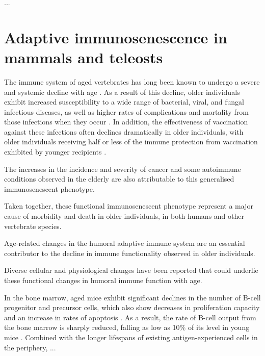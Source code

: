 ...



\section{Adaptive immunosenescence in mammals and teleosts} %

The immune system of aged vertebrates has long been known to undergo a severe and systemic decline with age \parencite{segre1977immunosenescence}. As a result of this decline, older individuals exhibit increased susceptibility to a wide range of bacterial, viral, and fungal infectious diseases, as well as higher rates of complications and mortality from those infections when they occur \parencite{sambhara2009vaccination}. In addition, the effectiveness of vaccination against these infections often declines dramatically in older individuals, with older individuals receiving half or less of the immune protection from vaccination exhibited by younger recipients \parencite{sambhara2009vaccination}. %

The increases in the incidence and severity of cancer and some autoimmune conditions observed in the elderly are also attributable to this generalised immunosenescent phenotype.


Taken together, these functional immunosenescent phenotype represent a major cause of morbidity and death in older individuals, in both humans and other vertebrate species.

Age-related changes in the humoral adaptive immune system are an essential contributor to the decline in immune functionality observed in older individuals. 


Diverse cellular and physiological changes have been reported that could underlie these functional changes in humoral immune function with age. 

In the bone marrow, aged mice exhibit significant declines in the number of B-cell progenitor and precursor cells, which also show decreases in proliferation capacity and an increase in rates of apoptosis \parencite{montecino2013immunosenescence,kogut2012bcells}. As a result, the rate of \naive B-cell output from the bone marrow is sharply reduced, falling as low as 10\% of its level in young mice \parencite{kogut2012bcells}. Combined with the longer lifespans of existing antigen-experienced cells in the periphery, ...

